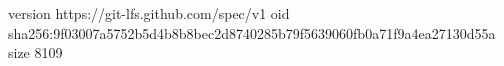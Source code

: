 version https://git-lfs.github.com/spec/v1
oid sha256:9f03007a5752b5d4b8b8bec2d8740285b79f5639060fb0a71f9a4ea27130d55a
size 8109
